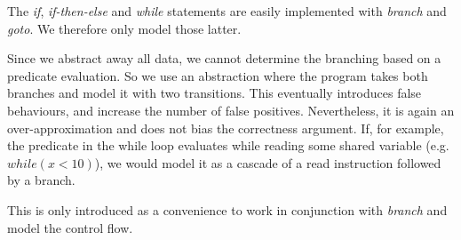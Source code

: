 The \emph{if}, \emph{if-then-else} and \emph{while} statements are
easily implemented with \emph{branch} and \emph{goto}. We therefore
only model those latter.

\noindent%

\noindent%
Since we abstract away all data, we cannot determine the branching
based on a predicate evaluation. So we use an abstraction where the
program takes both branches and model it with two transitions. This
eventually introduces false behaviours, and increase the number of
false positives. Nevertheless, it is again an over-approximation and
does not bias the correctness argument. If, for example, the predicate
in the while loop evaluates while reading some shared variable
(e.g. $while(x<10)$), we would model it as a cascade of a read
instruction followed by a branch.
%


\vspace{6cm}

This is only introduced as a convenience to work in conjunction with
\emph{branch} and model the control flow.

\noindent%

